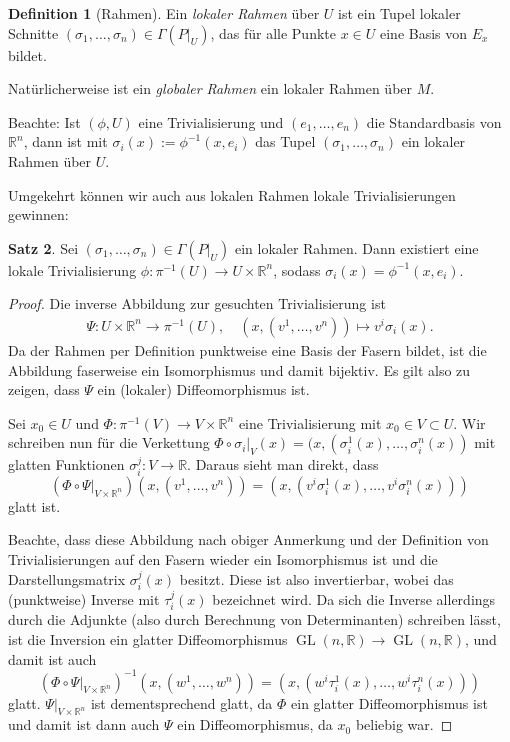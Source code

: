\documentclass[a4paper]{scrbook}
\numberwithin{equation}{chapter}
\DeclareMathOperator{\GL}{GL}
\newcommand{\R}{\mathbb{R}}
\theoremstyle{definition}
\newtheorem{defn}{Definition}[section]
\newtheorem{satz}[defn]{Satz}
\begin{document}
		\begin{defn}[Rahmen]
			Ein \emph{lokaler Rahmen} über $U$ ist ein Tupel lokaler Schnitte $(\sigma_1,\ldots,\sigma_n)\in\Gamma(P\vert_U)$, das für alle Punkte $x\in U$ eine Basis von $E_x$ bildet.
			
			Natürlicherweise ist ein \emph{globaler Rahmen} ein lokaler Rahmen über $M$.
			
			Beachte: Ist $(\phi,U)$ eine Trivialisierung und $(e_1,\ldots,e_n)$ die Standardbasis von $\R^n$, dann ist mit $\sigma_i(x):=\phi^{-1}(x,e_i)$ das Tupel $(\sigma_1,\ldots,\sigma_n)$ ein lokaler Rahmen über $U$.
		\end{defn}
		Umgekehrt können wir auch aus lokalen Rahmen lokale Trivialisierungen gewinnen:
		\begin{satz}
			Sei $(\sigma_1,\ldots,\sigma_n)\in\Gamma(P\vert_U)$ ein lokaler Rahmen. Dann existiert eine lokale Trivialisierung $\phi\colon \pi^{-1}(U)\rightarrow U\times\R^n$, sodass $\sigma_i(x)=\phi^{-1}(x,e_i)$.
			\begin{proof}
				Die inverse Abbildung zur gesuchten Trivialisierung ist 
				\begin{align*}
					\Psi\colon U\times\R^n\rightarrow \pi^{-1}(U),\quad (x,(v^1,\ldots,v^n))\mapsto v^i\sigma_i(x).
				\end{align*}
				Da der Rahmen per Definition punktweise eine Basis der Fasern bildet, ist die Abbildung faserweise ein Isomorphismus und damit bijektiv. Es gilt also zu zeigen, dass $\Psi$ ein (lokaler) Diffeomorphismus ist.
				
				Sei $x_0\in U$ und $\Phi\colon \pi^{-1}(V)\rightarrow V\times \R^n$ eine Trivialisierung mit $x_0\in V\subset U$. Wir schreiben nun für die Verkettung $\left.\Phi\circ \sigma_i\right|_V(x)=(x,(\sigma^1_i(x),\ldots,\sigma^n_i(x))$ mit glatten Funktionen $\sigma^j_i\colon V\rightarrow \R$. Daraus sieht man direkt, dass 
				\[\left(\left.\Phi\circ\Psi\right|_{V\times\R^n}\right)(x,(v^1,\ldots,v^n))=(x,(v^i\sigma^1_i(x),\ldots,v^i\sigma_i^n(x)))\]
				glatt ist.
				
				Beachte, dass diese Abbildung nach obiger Anmerkung und der Definition von Trivialisierungen auf den Fasern wieder ein Isomorphismus ist und die Darstellungsmatrix $\sigma^j_i(x)$ besitzt. Diese ist also invertierbar, wobei das (punktweise) Inverse mit $\tau^j_i(x)$ bezeichnet wird. Da sich die Inverse allerdings durch die Adjunkte (also durch Berechnung von Determinanten) schreiben lässt, ist die Inversion ein glatter Diffeomorphismus $\GL(n,\R)\rightarrow \GL(n,\R)$, und damit ist auch 
				\[\left(\left.\Phi\circ\Psi\right|_{V\times\R^n}\right)^{-1}(x,(w^1,\ldots,w^n))=(x,(w^i\tau_i^1(x),\ldots,w^i\tau_i^n(x)))\]
				glatt. $\left.\Psi\right|_{V\times\R^n}$ ist dementsprechend glatt, da $\Phi$ ein glatter Diffeomorphismus ist und damit ist dann auch $\Psi$ ein Diffeomorphismus, da $x_0$ beliebig war. 
			\end{proof}
		\end{satz}
\end{document}
